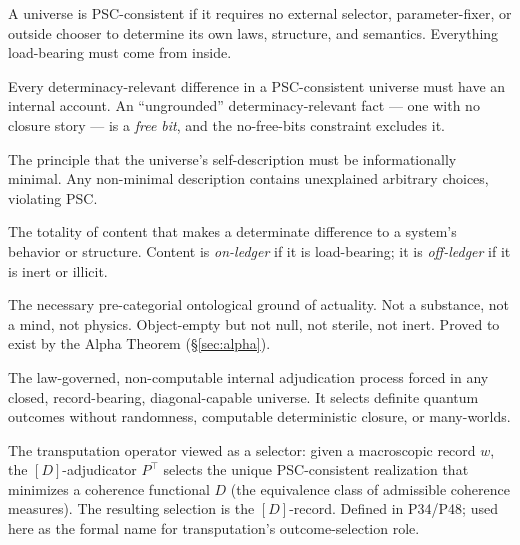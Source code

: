 \documentclass[11pt]{article}
\theoremstyle{remark}
\begin{document}
\begin{tcolorbox}[colback=gray!14,colframe=gray!55!black,title={Core Vocabulary (concise)}]
\begin{termlist}
\item[Perfect Self-Containment (PSC)]
  A universe is PSC-consistent if it requires no external selector, parameter-fixer,
  or outside chooser to determine its own laws, structure, and semantics. Everything
  load-bearing must come from inside.

\item[No Free Bits]
  Every determinacy-relevant difference in a PSC-consistent universe must have an
  internal account. An ``ungrounded'' determinacy-relevant fact --- one with no closure
  story --- is a \emph{free bit}, and the no-free-bits constraint excludes it.

\item[Minimum Description Length (MDL)]
  The principle that the universe's self-description must be informationally minimal.
  Any non-minimal description contains unexplained arbitrary choices, violating PSC.

\item[Semantic Ledger]
  The totality of content that makes a determinate difference to a system's behavior
  or structure. Content is \emph{on-ledger} if it is load-bearing; it is
  \emph{off-ledger} if it is inert or illicit.

\item[Alpha ($\alpha$)]
  The necessary pre-categorial ontological ground of actuality. Not a substance, not
  a mind, not physics. Object-empty but not null, not sterile, not inert. Proved to
  exist by the Alpha Theorem (\S\ref{sec:alpha}).

\item[Transputation]
  The law-governed, non-computable internal adjudication process forced in any closed,
  record-bearing, diagonal-capable universe.   It selects definite quantum outcomes
  without randomness, computable deterministic closure, or many-worlds.

\item[{$[D]$}-adjudicator / {$[D]$}-record]
  The transputation operator viewed as a selector: given a macroscopic record $w$,
  the $[D]$-adjudicator $P^\top$ selects the unique PSC-consistent realization that
  minimizes a coherence functional $D$ (the equivalence class of admissible coherence
  measures). The resulting selection is the $[D]$-record. Defined in P34/P48;
  used here as the formal name for transputation's outcome-selection role.


\end{termlist}
\end{tcolorbox}
\end{document}
